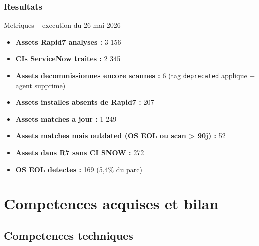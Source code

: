 \documentclass{rapport}
\begin{document}
\subsubsection{Resultats}

\begin{boitetech}{Metriques -- execution du 26 mai 2026}
\begin{itemize}[noitemsep]
  \item \textbf{Assets Rapid7 analyses :} 3 156
  \item \textbf{CIs ServiceNow traites :} 2 345
  \item \textbf{Assets decommissionnes encore scannes :} 6
        (tag \texttt{deprecated} applique + agent supprime)
  \item \textbf{Assets installes absents de Rapid7 :} 207
  \item \textbf{Assets matches a jour :} 1 249
  \item \textbf{Assets matches mais outdated (OS EOL ou scan > 90j) :} 52
  \item \textbf{Assets dans R7 sans CI SNOW :} 272
  \item \textbf{OS EOL detectes :} 169 (5,4\% du parc)
\end{itemize}
\end{boitetech}

\section{Competences acquises et bilan}

\subsection{Competences techniques}
\end{document}
